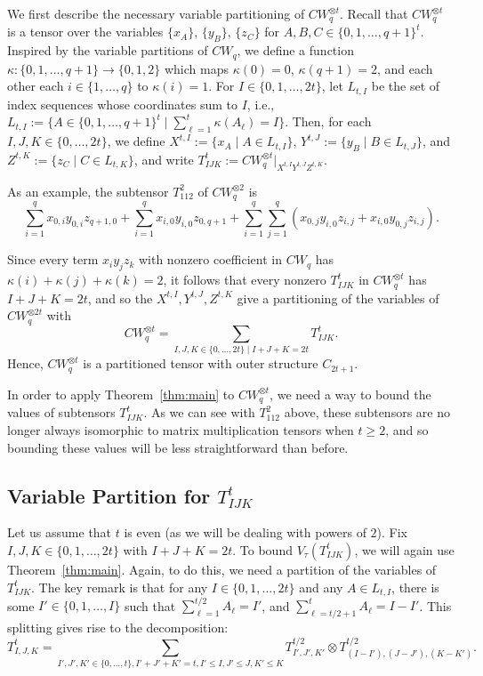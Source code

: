 \PassOptionsToPackage{shortlabels}{enumitem}\documentclass[10pt,a4paper]{article}
\begin{document}
We first describe the necessary variable partitioning of $CW_q^{\otimes t}$. Recall that $CW_q^{\otimes t}$ is a tensor over the variables $\{x_A\}$, $\{y_B\}$, $\{z_C\}$ for $A,B,C\in \{0,1,\ldots,q+1\}^{t}$. 
Inspired by the variable partitions of $CW_q$, we define a function $\kappa:\{0,1,\ldots,q+1\}\rightarrow \{0,1,2\}$ which maps $\kappa(0)=0$, $\kappa(q+1)=2$, and each other each $i\in \{1,\ldots,q\}$ to $\kappa(i)=1$. For $I \in \{0,1,\ldots,2t\}$, let $L_{t,I}$ be the set of index sequences whose coordinates sum to $I$, i.e., $L_{t,I} := \{ A \in \{0,1,\ldots,q+1\}^t \mid \sum_{\ell=1}^t \kappa(A_\ell)=I \}$. Then, for each $I,J,K \in \{0,\ldots,2t\}$, we define $X^{t,I} := \{x_A \mid A \in L_{t,I} \}$, $Y^{t,J} := \{y_B \mid B \in L_{t,J} \}$, and $Z^{t,K} := \{z_C \mid C \in L_{t,K} \}$, and write $T^{t}_{IJK} := CW_q^{\otimes t}|_{X^{t,I} Y^{t,J} Z^{t,K}}$.

As an example, the subtensor $T^2_{112}$ of $CW^{\otimes 2}_q$ is $$\sum_{i=1}^q x_{0,i} y_{0,i} z_{q+1,0} + \sum_{i=1}^q x_{i,0} y_{i,0} z_{0,q+1} + \sum_{i=1}^q\sum_{j=1}^q (x_{0,j} y_{i,0} z_{i,j} + x_{i,0} y_{0,j} z_{i,j}).$$


Since every term $x_iy_jz_k$ with nonzero coefficient in $CW_q$ has $\kappa(i)+\kappa(j)+\kappa(k)=2$, it follows that every nonzero $T^t_{IJK}$ in $CW_q^{\otimes t}$ has $I+J+K=2t$, and so the $X^{t,I},Y^{t,J},Z^{t,K}$ give a partitioning of the variables of $CW_q^{\otimes 2t}$ with
$$CW_q^{\otimes t} = \sum_{I,J,K\in \{0,\ldots,2t\} \mid I+J+K=2t} T^t_{IJK}.$$ Hence, $CW_q^{\otimes t}$ is a partitioned tensor with outer structure $C_{2t+1}$.



In order to apply Theorem~\ref{thm:main} to $CW_q^{\otimes t}$, we need a way to bound the values of subtensors $T^t_{IJK}$. As we can see with $T^2_{112}$ above, these subtensors are no longer always isomorphic to matrix multiplication tensors when $t \geq 2$, and so bounding these values will be less straightforward than before.


\subsection{Variable Partition for \texorpdfstring{$T^t_{IJK}$}{TIJKt}} \label{subsec:Tpart}
Let us assume that $t$ is even (as we will be dealing with powers of $2$).
Fix $I,J,K \in \{0,1,\ldots,2t\}$ with $I+J+K=2t$. To bound $V_\tau(T^t_{IJK})$, we will again use Theorem~\ref{thm:main}.  Again, to do this, we need a partition of the variables of $T^t_{IJK}$. The key remark is that for any $I \in \{0,1,\ldots,2t\}$ and any $A \in L_{t,I}$, there is some $I' \in \{0,1,\ldots,I\}$ such that $\sum_{\ell=1}^{t/2} A_\ell = I'$, and $\sum_{\ell=t/2+1}^t A_\ell = I-I'$. This splitting gives rise to the decomposition: 
$$T^{t}_{I,J,K} = \sum_{I',J',K'\in \{0,\ldots,t\}, I'+J'+K'=t, I'\leq I,J'\leq J, K'\leq K} T^{t/2}_{I',J',K'}\otimes T^{t/2}_{(I-I'),(J-J'),(K-K')}.$$
\end{document}
